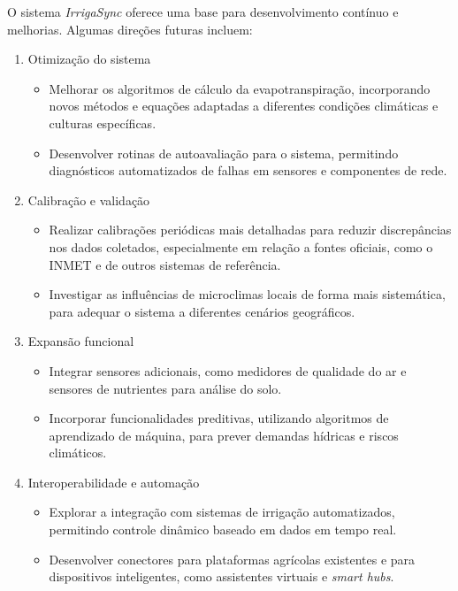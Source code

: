 O sistema \textit{IrrigaSync} oferece uma base para desenvolvimento contínuo e melhorias. Algumas direções futuras incluem:  

\begin{enumerate}
    \item Otimização do sistema
        \begin{itemize}
            \item Melhorar os algoritmos de cálculo da evapotranspiração, incorporando novos métodos e equações adaptadas a diferentes condições climáticas e culturas específicas.  
            \item Desenvolver rotinas de autoavaliação para o sistema, permitindo diagnósticos automatizados de falhas em sensores e componentes de rede.  
        \end{itemize}
    \item Calibração e validação
        \begin{itemize}
            \item Realizar calibrações periódicas mais detalhadas para reduzir discrepâncias nos dados coletados, especialmente em relação a fontes oficiais, como o INMET e de outros sistemas de referência. 
            \item Investigar as influências de microclimas locais de forma mais sistemática, para adequar o sistema a diferentes cenários geográficos.  
        \end{itemize}
    \item Expansão funcional  
        \begin{itemize}
            \item Integrar sensores adicionais, como medidores de qualidade do ar e sensores de nutrientes para análise do solo.  
            \item Incorporar funcionalidades preditivas, utilizando algoritmos de aprendizado de máquina, para prever demandas hídricas e riscos climáticos.  
        \end{itemize}
    \item Interoperabilidade e automação  
        \begin{itemize}
            \item Explorar a integração com sistemas de irrigação automatizados, permitindo controle dinâmico baseado em dados em tempo real.  
            \item Desenvolver conectores para plataformas agrícolas existentes e para dispositivos inteligentes, como assistentes virtuais e \textit{smart hubs}.  
        \end{itemize}

\end{enumerate}
